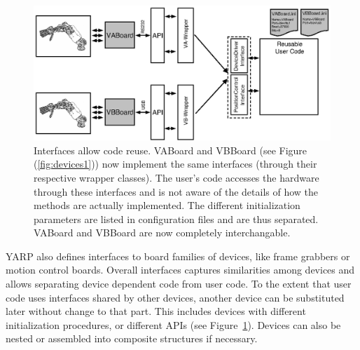 \begin{figure}[tbp]
\centerline{
\includegraphics[width=24cm]{fig-devices2}
}
\caption{Interfaces allow code reuse. VABoard and VBBoard (see 
Figure (\ref{fig:devices1})) now implement
the same interfaces (through their respective wrapper classes). The user's 
code accesses the hardware through these interfaces and is not aware of 
the details of how the methods are actually implemented. The different 
initialization parameters are listed in configuration files and are thus 
separated. VABoard and VBBoard are now completely interchangable.}
\label{fig:devices2}
\end{figure}

YARP also defines interfaces to board families of devices, like 
frame grabbers or motion control boards. Overall interfaces 
captures similarities among devices and allows separating device 
dependent code from user code. To the extent that user code uses 
interfaces shared by other devices, another device can be substituted 
later without change to that part. This includes devices with different 
initialization procedures, or different APIs (see Figure~\ref{fig:devices2}).  
Devices can also be nested or assembled into composite structures if necessary.





